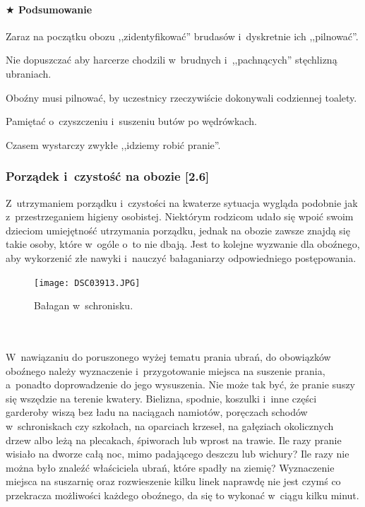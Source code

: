 \documentclass[a5paper,10pt,titlepage,twoside]{article}
\newcommand*{\thecheckbox}{\hss$\Box$} %
\newenvironment*{checklist}
{\list{}{%
\renewcommand*{\makelabel}[1]{\thecheckbox}}}
{\endlist}
\begin{document}
\paragraph{$\bigstar$ Podsumowanie}
\begin{checklist}
\item Zaraz na początku obozu ,,zidentyfikować'' brudasów i~dyskretnie ich ,,pilnować''.
\item Nie dopuszczać aby harcerze chodzili w~brudnych i~,,pachnących'' stęchlizną ubraniach.
\item Oboźny musi pilnować, by uczestnicy rzeczywiście dokonywali codziennej toalety.
\item Pamiętać o~czyszczeniu i~suszeniu butów po wędrówkach.
\item Czasem wystarczy zwykłe ,,idziemy robić pranie''.
\end{checklist}
\subsubsection{Porządek i~czystość na obozie [2.6]}
Z~utrzymaniem porządku i~czystości na kwaterze sytuacja wygląda podobnie jak z~przestrzeganiem higieny osobistej. Niektórym rodzicom udało się wpoić swoim dzieciom umiejętność utrzymania porządku, jednak na obozie zawsze znajdą się takie osoby, które w~ogóle o~to nie dbają. Jest to kolejne wyzwanie dla oboźnego, aby wykorzenić złe nawyki i~nauczyć bałaganiarzy odpowiedniego postępowania.
\begin{figure}[htp]
\centering
\texttt{[image: DSC03913.JPG]}
\caption{Bałagan w~schronisku.}\label{fig:balagan-w-schronisku}
\end{figure}
\\
\\
W~nawiązaniu do poruszonego wyżej tematu prania ubrań, do obowiązków oboźnego należy wyznaczenie i~przygotowanie miejsca na suszenie prania, a~ponadto doprowadzenie do jego wysuszenia. Nie może tak być, że pranie suszy się wszędzie na terenie kwatery. Bielizna, spodnie, koszulki i~inne części garderoby wiszą bez ładu na naciągach namiotów, poręczach schodów w~schroniskach czy szkołach, na oparciach krzeseł, na gałęziach okolicznych drzew albo leżą na plecakach, śpiworach lub wprost na trawie. Ile razy pranie wisiało na dworze całą noc, mimo padającego deszczu lub wichury? Ile razy nie można było znaleźć właściciela ubrań, które spadły na ziemię? Wyznaczenie miejsca na suszarnię oraz rozwieszenie kilku linek naprawdę nie jest czymś co przekracza możliwości każdego oboźnego, da się to wykonać w~ciągu kilku minut.
\end{document}
